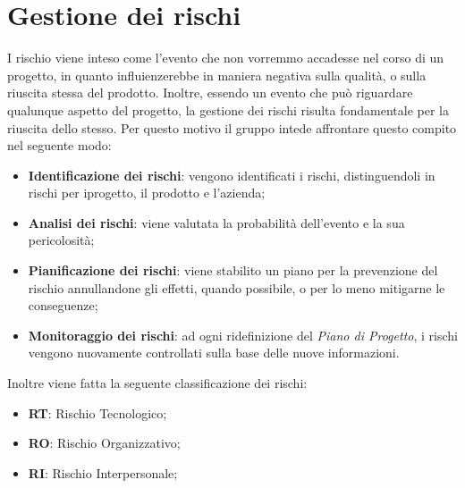 \section{Gestione dei rischi}
I rischio viene inteso come l'evento che non vorremmo accadesse nel corso di un progetto, in quanto influienzerebbe in maniera negativa sulla qualità, o sulla riuscita stessa del prodotto. Inoltre, essendo un evento che può riguardare qualunque aspetto del progetto, la gestione dei rischi risulta fondamentale per la riuscita dello stesso. Per questo motivo il gruppo intede affrontare questo compito nel seguente modo:\\
\begin{itemize}
\item \textbf{Identificazione dei rischi}: vengono identificati i rischi, distinguendoli in rischi per iprogetto, il prodotto e l'azienda;
\item \textbf{Analisi dei rischi}: viene valutata la probabilità dell'evento e la sua pericolosità;
\item \textbf{Pianificazione dei rischi}: viene stabilito un piano per la prevenzione del rischio annullandone gli effetti, quando possibile, o per lo meno mitigarne le conseguenze;
\item \textbf{Monitoraggio dei rischi}: ad ogni ridefinizione del \textit{Piano di Progetto}, i rischi vengono nuovamente controllati sulla base delle nuove informazioni.
\end{itemize}
Inoltre viene fatta la seguente classificazione dei rischi:
\begin{itemize}
\item \textbf{RT}: Rischio Tecnologico;
\item \textbf{RO}: Rischio Organizzativo;
\item \textbf{RI}: Rischio Interpersonale;
\end{itemize}

